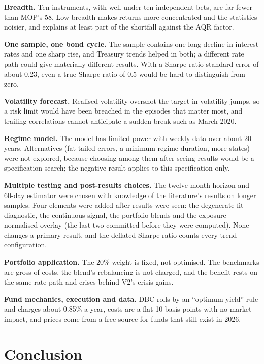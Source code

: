 \documentclass[11pt,a4paper]{article}
\begin{document}
\textbf{Breadth.} Ten instruments, with well under ten independent bets, are far fewer than MOP's 58. Low breadth makes returns more concentrated and the statistics noisier, and explains at least part of the shortfall against the AQR factor.

\textbf{One sample, one bond cycle.} The sample contains one long decline in interest rates and one sharp rise, and Treasury trends helped in both; a different rate path could give materially different results. With a Sharpe ratio standard error of about 0.23, even a true Sharpe ratio of 0.5 would be hard to distinguish from zero.

\textbf{Volatility forecast.} Realised volatility overshot the target in volatility jumps, so a risk limit would have been breached in the episodes that matter most, and trailing correlations cannot anticipate a sudden break such as March 2020.

\textbf{Regime model.} The model has limited power with weekly data over about 20 years. Alternatives (fat-tailed errors, a minimum regime duration, more states) were not explored, because choosing among them after seeing results would be a specification search; the negative result applies to this specification only.

\textbf{Multiple testing and post-results choices.} The twelve-month horizon and 60-day estimator were chosen with knowledge of the literature's results on longer samples. Four elements were added after results were seen: the degenerate-fit diagnostic, the continuous signal, the portfolio blends and the exposure-normalised overlay (the last two committed before they were computed). None changes a primary result, and the deflated Sharpe ratio counts every trend configuration.

\textbf{Portfolio application.} The 20\% weight is fixed, not optimised. The benchmarks are gross of costs, the blend's rebalancing is not charged, and the benefit rests on the same rate path and crises behind V2's crisis gains.

\textbf{Fund mechanics, execution and data.} DBC rolls by an ``optimum yield'' rule and charges about 0.85\% a year, costs are a flat 10 basis points with no market impact, and prices come from a free source for funds that still exist in 2026.

\section{Conclusion}
\end{document}
